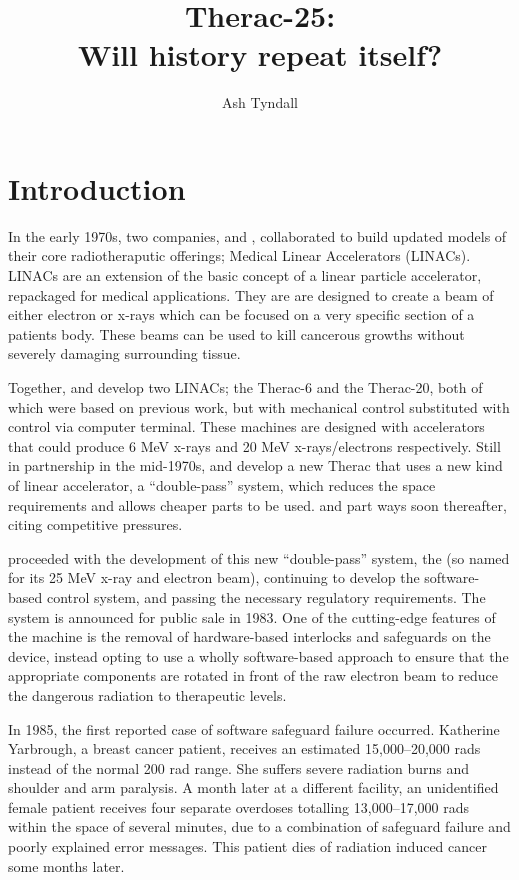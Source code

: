 \documentclass{cshonours}
\title{Therac-25:\\Will history repeat itself?}
\author{Ash Tyndall}
\begin{document}
\maketitle

\tableofcontents

\chapter{Introduction}

In the early 1970s, two companies, \aecl and \cgr, collaborated to build updated models of their core radiotheraputic offerings; Medical Linear Accelerators (LINACs). LINACs are an extension of the basic concept of a linear particle accelerator, repackaged for medical applications. They are are designed to create a beam of either electron or x-rays which can be focused on a very specific section of a patients body. These beams can be used to kill cancerous growths without severely damaging surrounding tissue.

Together, \aecl and \cgr develop two LINACs; the Therac-6 and the Therac-20, both of which were based on previous \cgr work, but with mechanical control substituted with control via computer terminal. These machines are designed with accelerators that could produce 6 MeV x-rays and 20 MeV x-rays/electrons respectively. Still in partnership in the mid-1970s, \aecl and \cgr develop a new Therac that uses a new kind of linear accelerator, a ``double-pass'' system, which reduces the space requirements and allows cheaper parts to be used. \aecl and \cgr part ways soon thereafter, citing competitive pressures. 

\aecl proceeded with the development of this new ``double-pass'' system, the \ther (so named for its 25 MeV x-ray and electron beam), continuing to develop the software-based control system, and passing the necessary regulatory requirements. The system is announced for public sale in 1983. One of the cutting-edge features of the machine is the removal of hardware-based interlocks and safeguards on the device, \aecl instead opting to use a wholly software-based approach to ensure that the appropriate components are rotated in front of the raw electron beam to reduce the dangerous radiation to therapeutic levels.

In 1985, the first reported case of \ther software safeguard failure occurred. Katherine Yarbrough, a breast cancer patient, receives an estimated 15,000--20,000 rads instead of the normal 200 rad range. She suffers severe radiation burns and shoulder and arm paralysis. A month later at a different facility, an unidentified female patient receives four separate overdoses totalling 13,000--17,000 rads within the space of several minutes, due to a combination of safeguard failure and poorly explained error messages. This patient dies of radiation induced cancer some months later.
\end{document}
